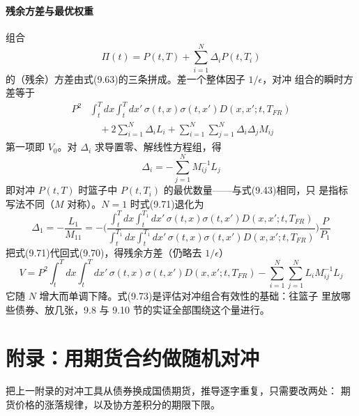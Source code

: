 \paragraph{残余方差与最优权重}
组合
\begin{equation*}
\Pi(t)=P(t,T)+\sum_{i=1}^{N}\Delta_iP(t,T_i)
\end{equation*}
的（残余）方差由式(9.63)的三条拼成。差一个整体因子 $1/\epsilon$，对冲
组合的瞬时方差等于
\begin{align*}
P^2&\int_{t}^{T}dx\int_{t}^{T}dx'\,\sigma(t,x)\sigma(t,x')
D(x,x';t,T_{FR})\\
&\quad+2\sum_{i=1}^{N}\Delta_iL_i
+\sum_{i=1}^{N}\sum_{j=1}^{N}\Delta_i\Delta_jM_{ij}\tag{9.70}
\end{align*}
第一项即 $V_0$。对 $\Delta_i$ 求导置零、解线性方程组，得
\begin{equation*}
\Delta_i=-\sum_{j=1}^{N}M^{-1}_{ij}L_j\tag{9.71}
\end{equation*}
即对冲 $P(t,T)$ 时篮子中 $P(t,T_i)$ 的最优数量——与式(9.43)相同，只
是指标写法不同（$M$ 对称）。$N=1$ 时式(9.71)退化为
\begin{equation*}
\Delta_1=-\frac{L_1}{M_{11}}
=-\biggl(\frac{\int_{t}^{T}dx\int_{t}^{T_1}dx'\,\sigma(t,x)\sigma(t,x')
D(x,x';t,T_{FR})}{\int_{t}^{T_1}dx\int_{t}^{T_1}dx'\,\sigma(t,x)\sigma(t,x')
D(x,x';t,T_{FR})}\biggr)\frac{P}{P_1}\tag{9.72}
\end{equation*}
把式(9.71)代回式(9.70)，得残余方差（仍略去 $1/\epsilon$）
\begin{equation*}
V=P^2\int_{t}^{T}dx\int_{t}^{T}dx'\,\sigma(t,x)\sigma(t,x')
D(x,x';t,T_{FR})
-\sum_{i=1}^{N}\sum_{j=1}^{N}L_iM^{-1}_{ij}L_j\tag{9.73}
\end{equation*}
它随 $N$ 增大而单调下降。式(9.73)是评估对冲组合有效性的基础：往篮子
里放哪些债券、放几张，9.8 与 9.10 节的实证全部围绕这个量进行。

\section{附录：用期货合约做随机对冲}

把上一附录的对冲工具从债券换成国债期货，推导逐字重复，只需要改两处：
期货价格的涨落规律，以及协方差积分的期限下限。

